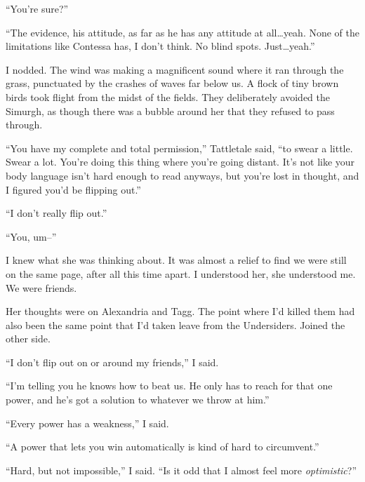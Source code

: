 ``You're sure?''



``The evidence, his attitude, as far as he has any attitude at all\ldots yeah.  None of the limitations like Contessa has, I don't think.  No blind spots.  Just\ldots yeah.''



I nodded.  The wind was making a magnificent sound where it ran through the grass, punctuated by the crashes of waves far below us.  A flock of tiny brown birds took flight from the midst of the fields.   They deliberately avoided the Simurgh, as though there was a bubble around her that they refused to pass through.



``You have my complete and total permission,'' Tattletale said, ``to swear a little.  Swear a lot.  You're doing this thing where you're going distant.  It's not like your body language isn't hard enough to read anyways, but you're lost in thought, and I figured you'd be flipping out.''



``I don't really flip out.''



``You, um--''



I knew what she was thinking about.  It was almost a relief to find we were still on the same page, after all this time apart.  I understood her, she understood me.  We were friends.



Her thoughts were on Alexandria and Tagg.  The point where I'd killed them had also been the same point that I'd taken leave from the Undersiders.  Joined the other side.



``I don't flip out on or around my friends,'' I said.



``I'm telling you he knows how to beat us.  He only has to reach for that one power, and he's got a solution to whatever we throw at him.''



``Every power has a weakness,'' I said.



``A power that lets you win automatically is kind of hard to circumvent.''



``Hard, but not impossible,'' I said.  ``Is it odd that I almost feel more \emph{optimistic}?''



